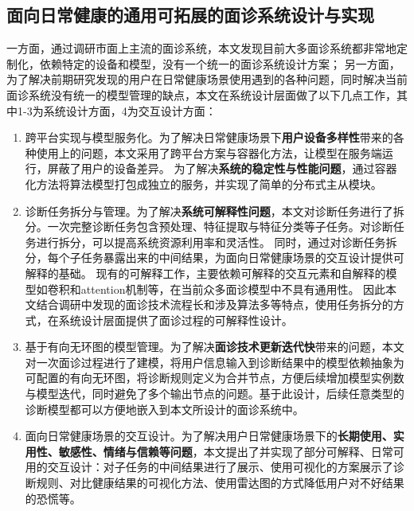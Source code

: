 \subsection{面向日常健康的通用可拓展的面诊系统设计与实现}
一方面，通过调研市面上主流的面诊系统，本文发现目前大多面诊系统都非常地定制化，依赖特定的设备和模型，没有一个统一的面诊系统设计方案；
另一方面，为了解决前期研究发现的用户在日常健康场景使用遇到的各种问题，同时解决当前面诊系统没有统一的模型管理的缺点，本文在系统设计层面做了以下几点工作，其中1-3为系统设计方面，4为交互设计方面：
\begin{enumerate}
\item 跨平台实现与模型服务化。为了解决日常健康场景下\textbf{用户设备多样性}带来的各种使用上的问题，本文采用了跨平台方案与容器化方法，让模型在服务端运行，屏蔽了用户的设备差异。
    为了解决\textbf{系统的稳定性与性能问题}，通过容器化方法将算法模型打包成独立的服务，并实现了简单的分布式主从模块。

    \item 诊断任务拆分与管理。为了解决\textbf{系统可解释性问题}，本文对诊断任务进行了拆分。一次完整诊断任务包含预处理、特征提取与特征分类等子任务。对诊断任务进行拆分，可以提高系统资源利用率和灵活性。
    同时，通过对诊断任务拆分，每个子任务暴露出来的中间结果，为面向日常健康场景的交互设计提供可解释的基础。
    现有的可解释工作，主要依赖可解释的交互元素和自解释的模型如卷积和attention机制等\cite{abdul2018trends}，在当前众多面诊模型中不具有通用性。
    因此本文结合调研中发现的面诊技术流程长和涉及算法多等特点，使用任务拆分的方式，在系统设计层面提供了面诊过程的可解释性设计。

    \item 基于有向无环图的模型管理。为了解决\textbf{面诊技术更新迭代快}带来的问题，本文对一次面诊过程进行了建模，将用户信息输入到诊断结果中的模型依赖抽象为可配置的有向无环图，将诊断规则定义为合并节点，方便后续增加模型实例数与模型迭代，同时避免了多个输出节点的问题。基于此设计，后续任意类型的诊断模型都可以方便地嵌入到本文所设计的面诊系统中。
    
    \item 面向日常健康场景的交互设计。为了解决用户日常健康场景下的\textbf{长期使用、实用性、敏感性、情绪与信赖等问题}，本文提出了并实现了部分可解释、日常可用的交互设计：对子任务的中间结果进行了展示、使用可视化的方案展示了诊断规则、对比健康结果的可视化方法、使用雷达图的方式降低用户对不好结果的恐慌等。
\end{enumerate}


